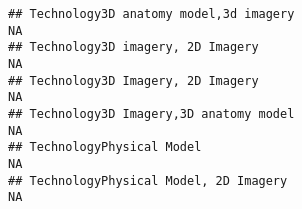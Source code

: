 \documentclass[]{article}
\begin{document}
\begin{verbatim}
## Technology3D anatomy model,3d imagery                                                                                                                                                                                                                                                                                                                                                                                                                                                   NA
## Technology3D imagery, 2D Imagery                                                                                                                                                                                                                                                                                                                                                                                                                                                        NA
## Technology3D Imagery, 2D Imagery                                                                                                                                                                                                                                                                                                                                                                                                                                                        NA
## Technology3D Imagery,3D anatomy model                                                                                                                                                                                                                                                                                                                                                                                                                                                   NA
## TechnologyPhysical Model                                                                                                                                                                                                                                                                                                                                                                                                                                                                NA
## TechnologyPhysical Model, 2D Imagery                                                                                                                                                                                                                                                                                                                                                                                                                                                    NA

\end{verbatim}
\end{document}

